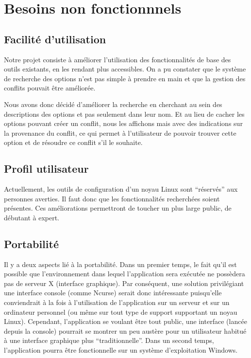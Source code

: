 \documentclass[16pts]{report}
\begin{document}
\chapter{Besoins non fonctionnnels}
\label{cha:Besoins non fonctionnnels}

\section{Facilité d'utilisation}
\label{sec:Facilité d'utilisation}

Notre projet consiste à améliorer l’utilisation des fonctionnalités de base des
outils existants, en les rendant plus accessibles. On a pu constater que le
système de recherche des options n’est pas simple à prendre en main et que la
gestion des conflits pouvait être améliorée.

Nous avons donc décidé d’améliorer la recherche en cherchant au sein des
descriptions des options et pas seulement dans leur nom. Et au lieu de cacher
les options pouvant créer un conflit, nous les affichons mais avec des
indications sur la provenance du conflit, ce qui permet à l’utilisateur de
pouvoir trouver cette option et de résoudre ce conflit s’il le souhaite.

\section{Profil utilisateur}
\label{sec:Profil utilisateur}

Actuellement, les outils de configuration d’un noyau Linux sont “réservés” aux
personnes averties. Il faut donc que les fonctionnalités recherchées soient
présentes. Ces améliorations permettront de toucher un plus large public, de
débutant à expert.

\section{Portabilité}
\label{sec:Portabilité}

Il y a deux aspects lié à la portabilité. Dans un premier temps, le fait qu’il
est possible que l’environnement dans lequel l’application sera exécutée ne
possèdera pas de serveur X (interface graphique). Par conséquent, une solution
privilégiant une interface console (comme Ncurse) serait donc intéressante
puisqu’elle conviendrait à la fois à l’utilisation de l’application sur un
serveur et sur un ordinateur personnel (ou même sur tout type de support
supportant un noyau Linux). Cependant, l’application se voulant être tout
public, une interface (lancée depuis la console) pourrait se montrer un peu
austère pour un utilisateur habitué à une interface graphique plus
“traditionnelle”.  Dans un second temps, l’application pourra être
fonctionnelle sur un système d’exploitation Windows.
\end{document}
